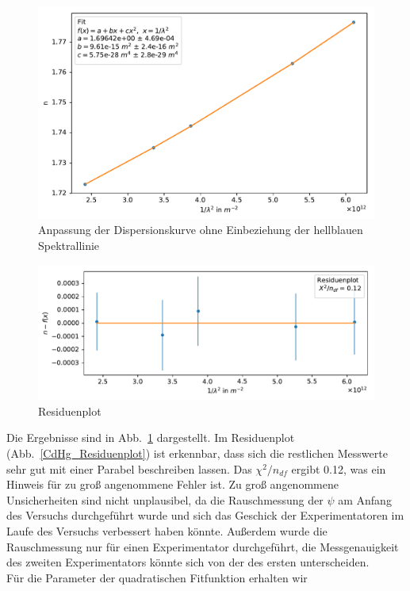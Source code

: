 \documentclass[12pt,a4paper]{article}
\begin{document}
\begin{figure}[H]
	\centering
	\includegraphics[width=0.95\linewidth]{Python/CdHg_Fit.pdf}
	\caption{Anpassung der Dispersionskurve ohne Einbeziehung der hellblauen Spektrallinie}
	\label{CdHg_LinReg}
\end{figure}
\begin{figure}[H]
	\centering
	\includegraphics[width=\linewidth]{Python/CdHg_Residuen.pdf}
	\caption{Residuenplot}
	\label{CdHg_Residuenplot}
\end{figure}
Die Ergebnisse sind in Abb.~\ref{CdHg_LinReg} dargestellt. Im Residuenplot (Abb.~\eqref{CdHg_Residuenplot}) ist erkennbar, dass sich die restlichen Messwerte sehr gut mit einer Parabel beschreiben lassen. Das $\chi^2/n_{df}$ ergibt 0.12, was ein Hinweis für zu groß angenommene Fehler ist. Zu groß angenommene Unsicherheiten sind nicht unplausibel, da die Rauschmessung der $\psi$ am Anfang des Versuchs durchgeführt wurde und sich das Geschick der Experimentatoren im Laufe des Versuchs verbessert haben könnte. Außerdem wurde die Rauschmessung nur für einen Experimentator durchgeführt, die Messgenauigkeit des zweiten Experimentators könnte sich von der des ersten unterscheiden.\\
Für die Parameter der quadratischen Fitfunktion erhalten wir
\end{document}
